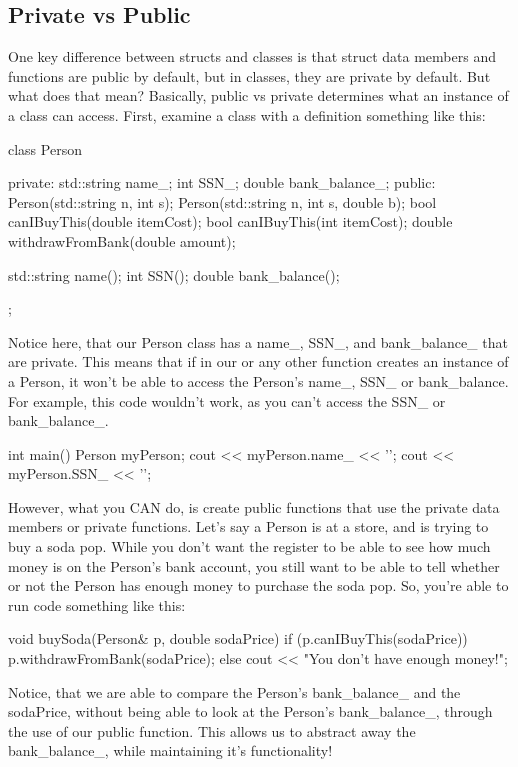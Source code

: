 \documentclass{tufte-handout}
\begin{document}
\subsection{Private vs Public}
One key difference between structs and classes is that struct data members and functions are public by default, but in classes, they are private by default.
But what does that mean?
Basically, public vs private determines what an instance of a class can access.
First, examine a class with a definition something like this:
\begin{Code}
class Person {
private:
    std::string name_;
    int SSN_;
    double bank_balance_;
public:
    Person(std::string n, int s);
    Person(std::string n, int s, double b);
    bool canIBuyThis(double itemCost);
    bool canIBuyThis(int itemCost);
    double withdrawFromBank(double amount);

    std::string name();
    int SSN();
    double bank_balance();
};
\end{Code}
Notice here, that our Person class has a name\_, SSN\_, and bank\_balance\_ that are private. 
This means that if in our  or any other function creates an instance of a Person, it won't be able to access the Person's name\_, SSN\_ or bank\_balance.
For example, this code wouldn't work, as you can't access the SSN\_ or bank\_balance\_.
\begin{Code}
int main(){
    Person myPerson;
    cout << myPerson.name_ << '\n';
    cout << myPerson.SSN_ << '\n';
}
\end{Code}
However, what you CAN do, is create public functions that use the private data members or private functions.
Let's say a Person is at a store, and is trying to buy a soda pop.
While you don't want the register to be able to see how much money is on the Person's bank account, you still want to be able to tell whether or not the Person has enough money to purchase the soda pop.
So, you're able to run code something like this:
\begin{Code}
void buySoda(Person& p, double sodaPrice) {
    if (p.canIBuyThis(sodaPrice)) {
        p.withdrawFromBank(sodaPrice);
    }
    else {
        cout << "You don't have enough money!\n";
    }
}
\end{Code}
Notice, that we are able to compare the Person's bank\_balance\_ and the sodaPrice, without being able to look at the Person's bank\_balance\_, through the use of our public  function.
This allows us to abstract away the bank\_balance\_, while maintaining it's functionality!
\end{document}
